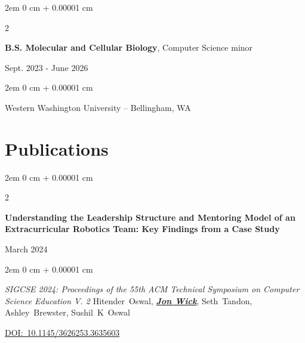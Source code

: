 \documentclass[11pt]{article}
\newcommand{\secrule}{\ \raisebox{0.5ex}{\hrulefill}}
\newenvironment{onecolentry}{
    \begin{adjustwidth}{
        2em
    }{
        0 cm + 0.00001 cm
    }
}{
    \end{adjustwidth}
} %
\newenvironment{twocolentry}[2][]{
    \onecolentry
    \def\secondColumn{#2}
    \setcolumnwidth{\fill, 5.5 cm}
    \begin{paracol}{2}
}{
    \switchcolumn \raggedleft \secondColumn
    \end{paracol}
    \endonecolentry
} %
\let\hrefWithoutArrow\href
\begin{document}
	\begin{twocolentry}{
			Sept. 2023 - June 2026}
		\textbf{B.S. Molecular and Cellular Biology}, Computer Science minor
	\end{twocolentry}
	\begin{onecolentry}
		Western Washington University -- Bellingham, WA
	\end{onecolentry}
\section{Publications\secrule}

\begin{twocolentry}{
		March 2024
	}
	\textbf{Understanding the Leadership Structure and Mentoring Model of an Extracurricular Robotics Team: Key Findings from a Case Study}
\end{twocolentry}


\begin{onecolentry}
	\textit{SIGCSE 2024: Proceedings of the 55th ACM Technical Symposium on Computer Science Education V. 2}
	\mbox{Hitender Oswal}, \underline{\textbf{\textit{Jon Wick}}}, \mbox{Seth Tandon}, \mbox{Ashley Brewster}, \mbox{Sushil K Oswal}


	\mbox{\hrefWithoutArrow{https://dl.acm.org/doi/10.1145/3626253.3635603}{DOI: 10.1145/3626253.3635603}}%
\end{onecolentry}
\end{document}
